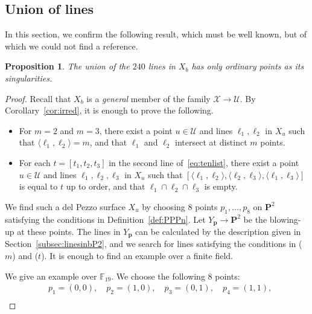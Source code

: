 \documentclass{math}
\theoremstyle{plain}
\newtheorem{proposition}[theorem]{Proposition}
\numberwithin{equation}{section}
\newcommand{\FF}{\mathord{\mathbb F}}
\newcommand{\UUU}{\mathord{\mathcal U}}
\newcommand{\XXX}{\mathord{\mathcal X}}
\newcommand{\intf}[1]{\langle #1 \rangle}
\newcommand{\bfP}{\mathbf{P}}
\newcommand{\bp}{\bm{p}}
\begin{document}
\subsection{Union of lines}\label{subsec:general}
%
In this section, we confirm the following result,
which must be well known,  but of which we could not find a reference.
%
\begin{proposition}\label{prop:union}
The union of the $240$ lines  in $X_b$ has only ordinary points 
as its singularities.
\end{proposition}
%
\begin{proof}
Recall that $X_b$ is a \emph{general} member of the family $\XXX\to \UUU$.
By Corollary~\ref{cor:irred},
it is enough to prove the following.
\begin{itemize}
\item[($m$)] For $m=2$ and $m=3$,
there exist a point $u\in \UUU$
and  lines $\ell_1, \ell_2$ in $X_u$ such that
$\intf{\ell_1, \ell_2}=m$, and that 
$\ell_1$ and $\ell_2$ intersect at distinct $m$ points.
\item[(\,$t$\,)]
For each $t=[t_1, t_2, t_3]$ in the second line of~\eqref{eq:tenlist},
there exist a point $u\in \UUU$
and  lines $\ell_1, \ell_2, \ell_3$ in $X_u$ such that $[\intf{\ell_1, \ell_2}, \intf{\ell_2, \ell_3},  \intf{\ell_1, \ell_3}]$ 
is equal to $t$ up to order,
and that  $\ell_1\cap  \ell_2\cap  \ell_3$  is empty.
\end{itemize}
%
We find such a del Pezzo surface $X_u$ by choosing $8$ points 
$p_1, \dots, p_8$ on ${\bfP}^{2}$ satisfying  the conditions in Definition~\ref{def:PPPn}.
Let $Y_{\bp}\to {\bfP}^{2}$ be the blowing-up at these points.
The lines in  $Y_{\bp}$ can be calculated 
by the description given in Section~\ref{subsec:linesinbP2},
and we search for lines satisfying
 the conditions  in  ($m$) and ($t$).
It is enough to find an example over a finite field.
 \par
 We give an example over  $\FF_{19}$.
 We choose the following 
$8$ points:
 \[
 \begin{aligned}
&p_1=(0,0),
\quad
p_2=(1,0),
\quad
p_3=(0,1),
\quad
p_4=(1,1),\\

\end{aligned}\]
\end{proof}
\end{document}
